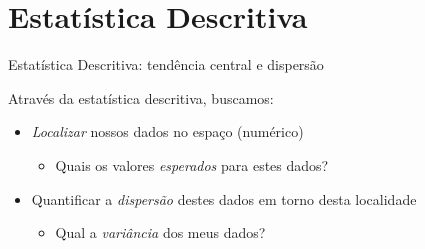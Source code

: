 \documentclass{beamer}\usepackage[]{graphicx}\usepackage[]{color}
\begin{document}


\section{Estatística Descritiva}

\begin{frame}{Estatística Descritiva: tendência central e dispersão}
\linespread{1.5} 
 
Através da estatística descritiva, buscamos: 
 
\begin{itemize}

\item \emph{Localizar} nossos dados no espaço (numérico)
\begin{itemize}
  \item Quais os valores \emph{esperados} para estes dados?
\end{itemize}
\vfill
\item  Quantificar a \emph{dispersão} destes dados em torno desta localidade
\begin{itemize}
  \item Qual a \emph{variância} dos meus dados?
\end{itemize}
\end{itemize}

\end{frame} 
\end{document}
